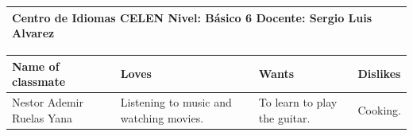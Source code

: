 \documentclass[11pt,a4paper]{article}
\begin{document}
\noindent
\begin{tabularx}{\textwidth}{|>{\raggedright\arraybackslash}X|}
\hline
\textbf{Centro de Idiomas CELEN}\newline
\textbf{Nivel:} B\'asico 6\newline
\textbf{Docente:} Sergio Luis Alvarez\\
\hline
\end{tabularx}
\vspace{0.4cm}

\noindent
\begin{tabularx}{\textwidth}{|>{\raggedright\arraybackslash}p{3.7cm}|>{\raggedright\arraybackslash}X|>{\raggedright\arraybackslash}X|>{\raggedright\arraybackslash}X|}
\hline
\rowcolor{headerorange}
\textbf{Name of classmate} & \textbf{Loves} & \textbf{Wants} & \textbf{Dislikes}\\
\hline
Nestor Ademir Ruelas Yana &
Listening to music and watching movies. &
To learn to play the guitar. &
Cooking.\\[1cm]
\hline
\end{tabularx}
\end{document}
